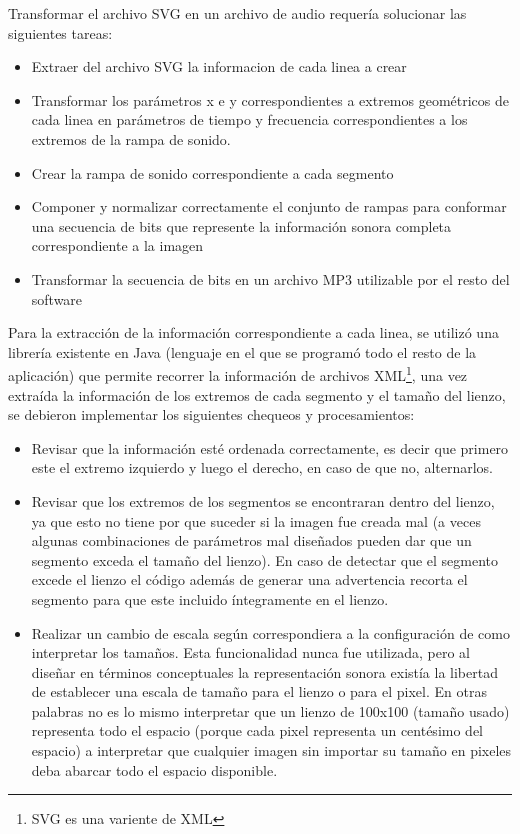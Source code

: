\documentclass{article}
\numberwithin{figure}{section}
\begin{document}
    Transformar el archivo SVG en un archivo de audio requería solucionar las siguientes tareas:
    
    \begin{itemize}
        \item Extraer del archivo SVG la informacion de cada linea a crear
        \item Transformar los parámetros x e y correspondientes a extremos geométricos de cada linea en parámetros de tiempo y frecuencia correspondientes a los extremos de la rampa de sonido.
        \item Crear la rampa de sonido correspondiente a cada segmento
        \item Componer y normalizar correctamente el conjunto de rampas para conformar una secuencia de bits que represente la información sonora completa correspondiente a la imagen
        \item Transformar la secuencia de bits en un archivo MP3 utilizable por el resto del software
    \end{itemize}
    
    Para la extracción de la información correspondiente a cada linea, se utilizó una librería existente en Java (lenguaje en el que se programó todo el resto de la aplicación) que permite recorrer la información de archivos XML\footnote{SVG es una variente de XML}, una vez extraída la información de los extremos de cada segmento y el tamaño del lienzo, se debieron implementar los siguientes chequeos y procesamientos:
    
    \begin{itemize}
        \item Revisar que la información esté ordenada correctamente, es decir que primero este el extremo izquierdo y luego el derecho, en caso de que no, alternarlos. 
        \item Revisar que los extremos de los segmentos se encontraran dentro del lienzo, ya que esto no tiene por que suceder si la imagen fue creada mal (a veces algunas combinaciones de parámetros mal diseñados pueden dar que un segmento exceda el tamaño del lienzo). En caso de detectar que el segmento excede el lienzo el código además de generar una advertencia recorta el segmento para que este incluido íntegramente en el lienzo.
        \item Realizar un cambio de escala según correspondiera a la configuración de como interpretar los tamaños. Esta funcionalidad nunca fue utilizada, pero al diseñar en términos conceptuales la representación sonora existía la libertad de establecer una escala de tamaño para el lienzo o para el pixel. En otras palabras no es lo mismo interpretar que un lienzo de 100x100 (tamaño usado) representa todo el espacio (porque cada pixel representa un centésimo del espacio) a interpretar que cualquier imagen sin importar su tamaño en pixeles deba abarcar todo el espacio disponible. 
    \end{itemize}
    
\end{document}

